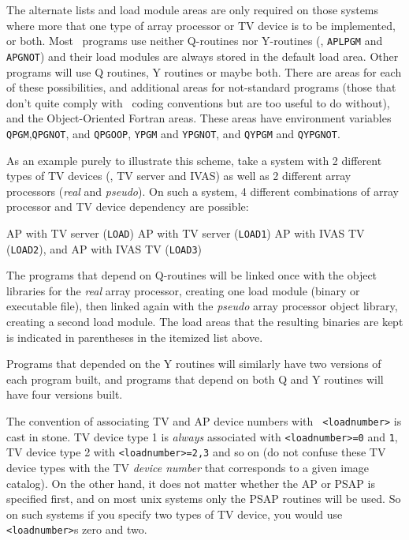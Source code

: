 The alternate lists and load module areas are only required on those
systems where more that one type of array processor or TV device is to
be implemented, or both.  Most \AIPS\ programs use neither Q-routines
nor Y-routines (\eg, {\tt\dol APLPGM} and {\tt\dol APGNOT}) and their load
modules are always stored in the default load area.  Other programs will
use Q routines, Y routines or maybe both.  There are areas for each of
these possibilities, and additional areas for not-standard programs
(those that don't quite comply with \aips\ coding conventions but are
too useful to do without), and the Object-Oriented Fortran areas.  These
areas have environment variables {\tt\dol QPGM},{\tt\dol QPGNOT}, and
{\tt\dol QPGOOP}, {\tt\dol YPGM} and {\tt\dol YPGNOT}, and {\tt\dol QYPGM} and
{\tt\dol QYPGNOT}.

As an example purely to illustrate this scheme, take a system with 2
different types of TV devices (\eg, TV server and IVAS) as well as 2
different array processors ({\it real\/} and {\it pseudo\/}).  On such
a system, 4 different combinations of array processor and TV device
dependency are possible:\medskip

{ AP with TV server ({\tt\dol LOAD})}
{ AP with TV server ({\tt \dol LOAD1})}
{ AP with IVAS TV ({\tt\dol LOAD2}), and}
{ AP with IVAS TV ({\tt\dol LOAD3})\medskip}
\medskip

\noindent The programs that depend on Q-routines will be linked once
with the object libraries for the {\it real\/} array processor,
creating one load module (binary or executable file), then linked
again with the {\it pseudo\/} array processor object library, creating
a second load module.  The load areas that the resulting binaries are
kept is indicated in parentheses in the itemized list above.

Programs that depended on the Y routines will similarly have two
versions of each program built, and programs that depend on both Q and
Y routines will have four versions built.

The convention of associating TV and AP device numbers with {\tt
<loadnumber>} is cast in stone.  TV device type 1 is {\it always\/}
associated with {\tt <loadnumber>=0} and {\tt 1}, TV device type 2 with
{\tt <loadnumber>=2,3} and so on (do not confuse these TV device types
with the TV {\it device number\/} that corresponds to a given image
catalog).  On the other hand, it does not matter whether the AP or PSAP
is specified first, and on most unix systems only the PSAP routines will
be used.  So on such systems if you specify two types of TV device, you
would use {\tt <loadnumber>}s zero and two.


